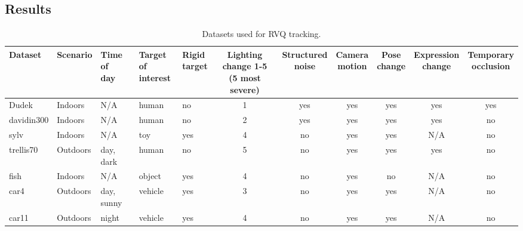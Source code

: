 


\begin{FrontMatter}
\contents %
\end{FrontMatter}
\begin{Body}

\chapter{Results}
\label{chap_results}	


\begin{table}[t]
\footnotesize
\begin{tabular}{p{0.6in}|p{0.6in}p{0.6in}p{0.4in}p{0.4in}cccccc}
Dataset 		&Scenario	     &\parbox[c]{0.4in}{\center Time of \\day} 	&\parbox[c]{0.26in}{\center Target of \\interest}  &\parbox{0.3in}{\center Rigid \\target} 	&\parbox{0.4in}{\center Lighting change 1-5 \\(5 most severe)}  	&\parbox{0.5in}{\center Structured \\noise} 	&\parbox{0.4in}{\center Camera \\motion} 	&\parbox{0.3in}{\center Pose \\change} 	&\parbox{0.45in}{\center Expression \\change} 	&\parbox{0.3in}{\center Temporary \\occlusion} 	\\\hline
Dudek 			&Indoors 	     &N/A 			&human 					&no 	&1 	&yes 	&yes 	&yes 	&yes 	&yes 		\\\hline
davidin300 	&Indoors		&N/A			&human					&no	&2	&yes	&yes	&yes	&yes	&no		\\\hline
sylv				&Indoors		&N/A			&toy						&yes	&4	&no	&yes	&yes	&N/A	&no		\\\hline
trellis70	 		&Outdoors 		&day, dark		&human					&no	&5	&no	&yes	&yes	&yes	&no		\\\hline
fish				&Indoors		&N/A			&object					&yes	&4	&no	&yes	&no	&N/A	&no		\\\hline
car4			&Outdoors 		&day, sunny	&vehicle					&yes	&3	&no	&yes	&yes	&N/A	&no		\\\hline
car11			&Outdoors		&night			&vehicle					&yes	&4	&no	&yes	&yes	&N/A	&no		\\\hline
\end{tabular}
\caption{Datasets used for RVQ tracking.}
\label{Tab:datasets_used}
\end{table}



\end{Body}
